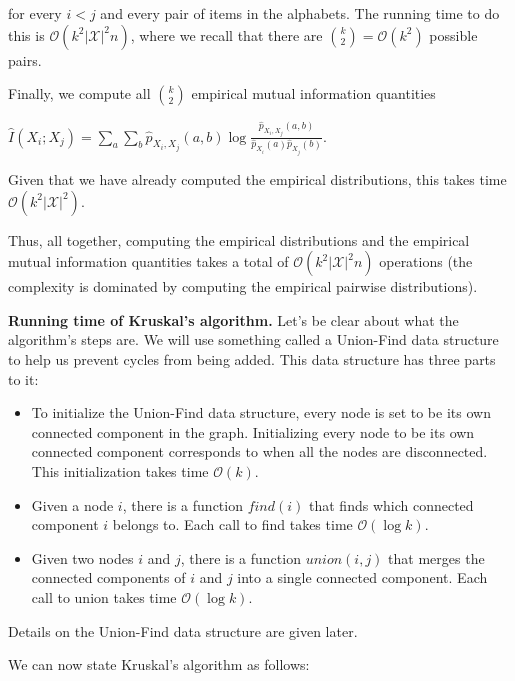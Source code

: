 for every $i<j$ and every pair of items in the alphabets. The running time to do this is $\mathcal{O}(k^{2}|\mathcal{X}|^{2}n)$, where we recall that there are ${k \choose 2}=\mathcal{O}(k^{2})$ possible pairs.

Finally, we compute all ${k \choose 2}$ empirical mutual information quantities

{\centering$\widehat{I}(X_{i};X_{j})=\sum _{a}\sum _{b}\widehat{p}_{X_{i},X_{j}}(a,b)\log \frac{\widehat{p}_{X_{i},X_{j}}(a,b)}{\widehat{p}_{X_{i}}(a)\widehat{p}_{X_{j}}(b)}.$ \par}
 
Given that we have already computed the empirical distributions, this takes time $\mathcal{O}(k^{2}|\mathcal{X}|^{2})$.

Thus, all together, computing the empirical distributions and the empirical mutual information quantities takes a total of $\mathcal{O}(k^{2}|\mathcal{X}|^{2}n)$ operations (the complexity is dominated by computing the empirical pairwise distributions).

\textbf{Running time of Kruskal's algorithm.} Let's be clear about what the algorithm's steps are. We will use something called a Union-Find data structure to help us prevent cycles from being added. This data structure has three parts to it:

\begin{itemize}
\item To initialize the Union-Find data structure, every node is set to be its own connected component in the graph. Initializing every node to be its own connected component corresponds to when all the nodes are disconnected. This initialization takes time $\mathcal{O}(k)$.

\item Given a node $i$, there is a function $find(i)$ that finds which connected component $i$ belongs to. Each call to find takes time $\mathcal{O}(\log k)$.

\item Given two nodes $i$ and $j$, there is a function $union(i,j)$ that merges the connected components of $i$ and $j$ into a single connected component. Each call to union takes time $\mathcal{O}(\log k)$.
\end{itemize}

Details on the Union-Find data structure are given later.

We can now state Kruskal's algorithm as follows:

